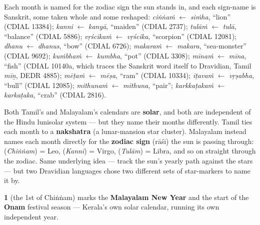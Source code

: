 \begin{cousinweb}
Each month is named for the zodiac sign the sun stands in, and each sign-name is Sanskrit, some taken whole and some reshaped: \emph{ciṅṅaṁ} $\leftarrow$ \emph{siṁha}, \textquotedblleft{}lion\textquotedblright{} (CDIAL 13384); \emph{kanni} $\leftarrow$ \emph{kanyā}, \textquotedblleft{}maiden\textquotedblright{} (CDIAL 2737); \emph{tulāṁ} $\leftarrow$ \emph{tulā}, \textquotedblleft{}balance\textquotedblright{} (CDIAL 5886); \emph{vṛścikaṁ} $\leftarrow$ \emph{vṛścika}, \textquotedblleft{}scorpion\textquotedblright{} (CDIAL 12081); \emph{dhanu} $\leftarrow$ \emph{dhanus}, \textquotedblleft{}bow\textquotedblright{} (CDIAL 6726); \emph{makaraṁ} $\leftarrow$ \emph{makara}, \textquotedblleft{}sea-monster\textquotedblright{} (CDIAL 9692); \emph{kuṁbhaṁ} $\leftarrow$ \emph{kumbha}, \textquotedblleft{}pot\textquotedblright{} (CDIAL 3308); \emph{mīnaṁ} $\leftarrow$ \emph{mīna}, \textquotedblleft{}fish\textquotedblright{} (CDIAL 10140a, which traces the Sanskrit word itself to Dravidian, Tamil \emph{mīṉ}, DEDR 4885); \emph{mēṭaṁ} $\leftarrow$ \emph{mēṣa}, \textquotedblleft{}ram\textquotedblright{} (CDIAL 10334); \emph{iṭavaṁ} $\leftarrow$ \emph{vṛṣabha}, \textquotedblleft{}bull\textquotedblright{} (CDIAL 12085); \emph{mithunaṁ} $\leftarrow$ \emph{mithuna}, \textquotedblleft{}pair\textquotedblright{}; \emph{karkkaṭakaṁ} $\leftarrow$ \emph{karkaṭaka}, \textquotedblleft{}crab\textquotedblright{} (CDIAL 2816).
\end{cousinweb}

\begin{culture}
Both Tamil's and Malayalam's calendars are \textbf{solar}, and both are independent of the Hindu lunisolar system — but they name their months differently. Tamil ties each month to a \textbf{nakshatra} (a lunar-mansion star cluster). Malayalam instead names each month directly for the \textbf{zodiac sign} (rāśi) the sun is passing through: \textbf{} (\emph{Chiṅṅam}) = Leo, \textbf{} (\emph{Kanni}) = Virgo, \textbf{} (\emph{Tulām}) = Libra, and so on straight through the zodiac. Same underlying idea — track the sun's yearly path against the stars — but two Dravidian languages chose two different sets of star-markers to name it by.

\textbf{ 1} (the 1st of Chiṅṅam) marks the \textbf{Malayalam New Year} and the start of the \textbf{Onam} festival season — Kerala's own solar calendar, running its own independent year.
\end{culture}

